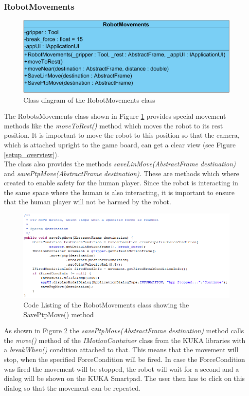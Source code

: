 \documentclass[a4paper]{spie}  %
\begin{document}
\begin{large}
\subsubsection{RobotMovements}
\begin{figure}[h]
\includegraphics[width=12cm]{images/class_roboMov.png}
\centering
\caption{Class diagram of the RobotMovements class}
\label{class_roboMov}
\end{figure}
The RobotsMovements class shown in Figure \ref{class_roboMov} provides special movement methods like the \emph{moveToRest()} method which moves the robot to its rest position. It is important to move the robot to this position so that the camera, which is attached upright to the game board, can get a clear view (see Figure \ref{setup_overview}). \\
The class also provides the methods \emph{saveLinMove(AbstractFrame destination)} and \emph{savePtpMove(AbstractFrame destination)}. These are methods which where  created to enable safety for the human player. Since the robot is interacting in the same space where the human is also interacting, it is important to ensure that the human player will not be harmed by the robot. \\
\begin{figure}[h]
\includegraphics[width=17cm]{images/code_safety.png}
\centering
\caption{Code Listing of the RobotMovements class showing the SavePtpMove() method}
\label{code_safety}
\end{figure}
As shown in Figure \ref{code_safety} the \emph{savePtpMove(AbstractFrame destination)} method calls the \emph{move()} method of the \emph{IMotionContainer} class from the KUKA libraries with a \textit{breakWhen()} condition attached to that. This means that the movement will stop, when the specified ForceCondition will be fired. In case the ForceCondition was fired the movement will be stopped, the robot will wait for a second and a dialog will be shown on the KUKA Smartpad. The user then has to click on this dialog so that the movement can be repeated.

\end{large}
\end{document}
